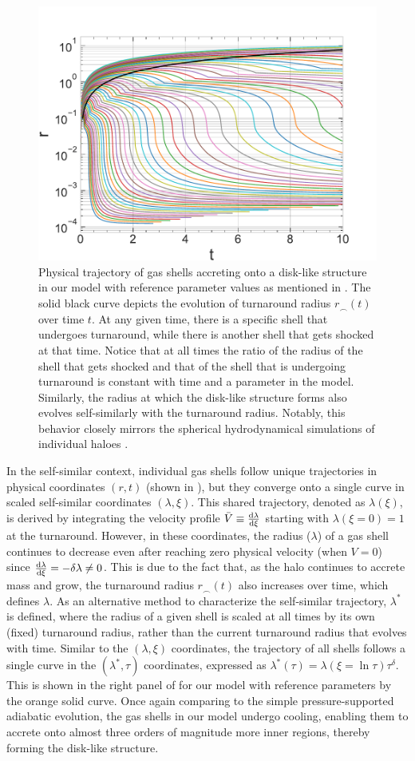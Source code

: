 \begin{figure}[htbp]
\centering
\includegraphics[width=0.6\linewidth]{plots/Eds-gas-1.67_trajectory_phys_ref.pdf}
\caption[]{Physical trajectory of gas shells accreting onto a disk-like structure in our model with reference parameter values as mentioned in . The solid black curve depicts the evolution of turnaround radius $r_{\smallfrown}(t)$ over time $t$. At any given time, there is a specific shell that undergoes turnaround, while there is another shell that gets shocked at that time. Notice that at all times the ratio of the radius of the shell that gets shocked and that of the shell that is undergoing turnaround is constant with time and a parameter in the model. Similarly, the radius at which the disk-like structure forms also evolves self-similarly with the turnaround radius. Notably, this behavior closely mirrors the spherical hydrodynamical simulations of individual haloes \cite{2006Dekel&Birnboim}.}
\label{fig:gas-traj-phys}
\end{figure}


In the self-similar context, individual gas shells follow unique trajectories in physical coordinates $(r,t)$ (shown in ), but they converge onto a single curve in scaled self-similar coordinates $(\lambda,\xi)$. This shared trajectory, denoted as $\lambda(\xi)$, is derived by integrating the velocity profile $\bar{V} \equiv \frac{{\rm d} \lambda}{{\rm d} \xi}$ starting with $\lambda(\xi=0)=1$ at the turnaround. However, in these coordinates, the radius ($\lambda$) of a gas shell continues to decrease even after reaching zero physical velocity (when $V=0$) since $\frac{{\rm d} \lambda}{{\rm d} \xi} = -\delta \lambda \neq 0$. This is due to the fact that, as the halo continues to accrete mass and grow, the turnaround radius $r_{\smallfrown}(t)$ also increases over time, which defines $\lambda$. As an alternative method to characterize the self-similar trajectory, $\lambda^*$ is defined, where the radius of a given shell is scaled at all times by its own (fixed) turnaround radius, rather than the current turnaround radius that evolves with time. Similar to the $(\lambda,\xi)$ coordinates, the trajectory of all shells follows a single curve in the $(\lambda^*,\tau)$ coordinates, expressed as $\lambda^*(\tau) = \lambda(\xi=\ln \tau) \tau^{\delta}$. This is shown in the right panel of  for our model with reference parameters by the orange solid curve. Once again comparing to the simple pressure-supported adiabatic evolution, the gas shells in our model undergo cooling, enabling them to accrete onto almost three orders of magnitude more inner regions, thereby forming the disk-like structure.

